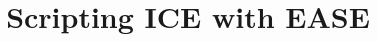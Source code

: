 \documentclass{article}
\begin{document}
\title{Scripting ICE with EASE}
\maketitle{}


\end{document}
